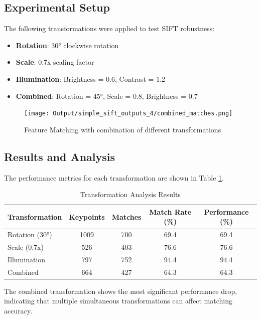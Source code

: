 \documentclass[12pt,a4paper]{article}
\begin{document}
\subsection{Experimental Setup}

The following transformations were applied to test SIFT robustness:

\begin{itemize}
    \item \textbf{Rotation}: 30° clockwise rotation
    \item \textbf{Scale}: 0.7x scaling factor
    \item \textbf{Illumination}: Brightness = 0.6, Contrast = 1.2
    \item \textbf{Combined}: Rotation = 45°, Scale = 0.8, Brightness = 0.7
\end{itemize}

\begin{figure}[!ht]
    \centering
    \texttt{[image: Output/simple\_sift\_outputs\_4/combined\_matches.png]}
    \caption{Feature Matching with combination of different transformations}
    \label{fig:fig10}
\end{figure}

\subsection{Results and Analysis}

The performance metrics for each transformation are shown in Table \ref{tab:transformation_results}.

\begin{table}[H]
\centering
\caption{Transformation Analysis Results}
\label{tab:transformation_results}
\begin{tabular}{@{}lcccc@{}}
\toprule
Transformation & Keypoints & Matches & Match Rate (\%) & Performance (\%) \\
\midrule
Rotation (30°) & 1009 & 700 & 69.4 & 69.4 \\
Scale (0.7x) & 526 & 403 & 76.6 & 76.6 \\
Illumination & 797 & 752 & 94.4 & 94.4 \\
Combined & 664 & 427 & 64.3 & 64.3 \\
\bottomrule
\end{tabular}
\end{table}


The combined transformation shows the most significant performance drop, indicating that multiple simultaneous transformations can affect matching accuracy.
\end{document}
